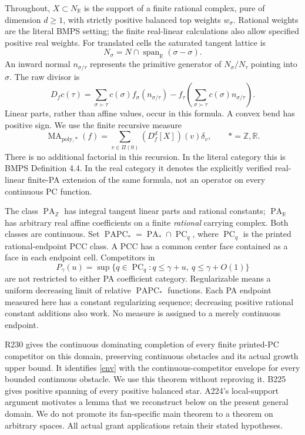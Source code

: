 \documentclass[11pt]{article}
\newcommand{\R}{\mathbb R}
\newcommand{\Z}{\mathbb Z}
\newcommand{\PC}{\operatorname{PC}}
\newcommand{\PA}{\operatorname{PA}}
\newcommand{\PAPC}{\operatorname{PAPC}}
\newcommand{\MAstar}{\operatorname{MA}_{\mathrm{poly},*}}
\begin{document}
Throughout, \(X\subset N_\R\) is the support of a finite rational complex,
pure of dimension \(d\geq1\), with strictly positive balanced top weights
\(w_\sigma\). Rational weights are the literal BMPS setting; the finite
real-linear calculations also allow specified positive real weights.
For translated cells the saturated tangent lattice is
\[
 N_\sigma=N\cap\operatorname{span}_\R(\sigma-\sigma).
\]
An inward normal \(n_{\sigma/\tau}\) represents the primitive generator of
\(N_\sigma/N_\tau\) pointing into \(\sigma\). The raw divisor is
\begin{equation}\label{raw}
 D_f c(\tau)=\sum_{\sigma\succ\tau}c(\sigma)f_\sigma(n_{\sigma/\tau})
 -f_\tau\left(\sum_{\sigma\succ\tau}c(\sigma)n_{\sigma/\tau}\right).
\end{equation}
Linear parts, rather than affine values, occur in this formula. A convex
bend has positive sign. We use the finite recursive measure
\[
 \MAstar(f)=\sum_{v\in\Pi(0)}(D_f^d[X])(v)\delta_v,\qquad *=\Z,\R.
\]
There is no additional factorial in this recursion. In the literal
category this is BMPS Definition 4.4. In the real category it denotes
the explicitly verified real-linear finite-PA extension of the same
formula, not an operator on every continuous PC function.

The class \(\PA_\Z\) has integral tangent linear parts and rational
constants; \(\PA_\R\) has arbitrary real affine coefficients on a finite
\emph{rational} carrying complex. Both classes are continuous.
Set \(\PAPC_*=\PA_*\cap\PC_q\), where \(\PC_q\) is the printed
rational-endpoint PCC class. A PCC has a common center face contained as
a face in each endpoint cell. Competitors in
\begin{equation}\label{env}
 P_\gamma(u)=\sup\{q\in\PC_q:q\leq\gamma+u,\ q\leq\gamma+O(1)\}
\end{equation}
are not restricted to either PA coefficient category.
Regularizable means a uniform decreasing limit of relative
\(\PAPC_*\) functions. Each PA endpoint measured here has a constant
regularizing sequence; decreasing positive rational constant additions
also work. No measure is assigned to a merely continuous endpoint.

R230 gives the continuous dominating completion of every finite printed-PC
competitor on this domain, preserving continuous obstacles and its actual
growth upper bound. It identifies \eqref{env} with the continuous-competitor
envelope for every bounded continuous obstacle. We use this theorem without
reproving it. B225 gives positive spanning of every positive balanced star.
A224's local-support argument motivates a lemma that we reconstruct below
on the present general domain. We do not promote its fan-specific main
theorem to a theorem on arbitrary spaces. All actual grant applications
retain their stated hypotheses.
\end{document}
